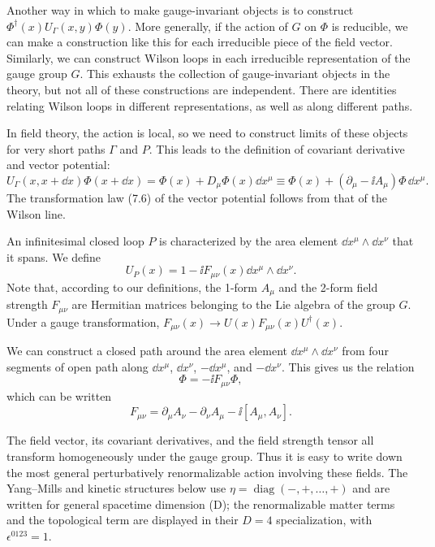 Another way in which to make gauge-invariant objects is to construct
$\Phi^\dagger(x)\allowbreak U_\Gamma(x,y)\Phi(y)$. More generally, if the action of $G$ on
$\Phi$ is reducible, we can make a construction like this for each irreducible
piece of the field vector. Similarly, we can construct Wilson loops in each
irreducible representation of the gauge group $G$. This exhausts the collection
of gauge-invariant objects in the theory, but not all of these constructions are
independent. There are identities relating Wilson loops in different
representations, as well as along different paths.

In field theory, the action is local, so we need to construct limits of these
objects for very short paths $\Gamma$ and $P$. This leads to the definition of
covariant derivative and vector potential:
\begin{equation*}
  U_\Gamma(x,x+\dd x)\Phi(x+\dd x)
  =\Phi(x)+D_\mu\Phi(x)\dd x^\mu
  \equiv\Phi(x)+(\partial_\mu-\ii A_\mu)\Phi\,\dd x^\mu.
\end{equation*}
The transformation law (7.6) of the vector potential follows from that of the
Wilson line.

An infinitesimal closed loop $P$ is characterized by the area element
$\dd x^\mu\wedge\dd x^\nu$ that it spans. We define
\begin{equation*}
  U_P(x)=1-\ii F_{\mu\nu}(x)\dd x^\mu\wedge\dd x^\nu.
\end{equation*}
Note that, according to our definitions, the 1-form $A_\mu$ and the 2-form
field strength $F_{\mu\nu}$ are Hermitian matrices belonging to the Lie algebra
of the group $G$. Under a gauge transformation,
$F_{\mu\nu}(x)\to U(x)F_{\mu\nu}(x)U^\dagger(x)$.

We can construct a closed path around the area element
$\dd x^\mu\wedge\dd x^\nu$ from four segments of open path along
$\dd x^\mu$, $\dd x^\nu$, $-\dd x^\mu$, and $-\dd x^\nu$. This gives us the
relation
\begin{equation*}
  [D_\mu,D_\nu]\Phi=-\ii F_{\mu\nu}\Phi,
\end{equation*}
which can be written
\begin{equation*}
  F_{\mu\nu}=\partial_\mu A_\nu-\partial_\nu A_\mu-\ii[A_\mu,A_\nu].
\end{equation*}

The field vector, its covariant derivatives, and the field strength tensor all
transform homogeneously under the gauge group. Thus it is easy to write down
the most general perturbatively renormalizable action involving these fields.
The Yang--Mills and kinetic structures below use
$\eta=\operatorname{diag}(-,+,\ldots,+)$ and are written for general spacetime
dimension (D); the renormalizable matter terms and the topological term are
displayed in their $D=4$ specialization, with $\epsilon^{0123}=1$.

